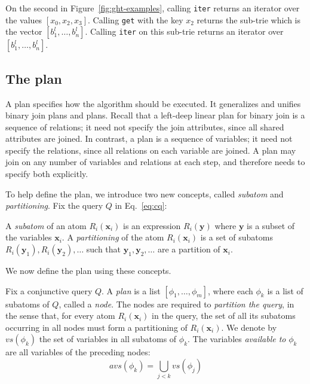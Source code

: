 \begin{example}
  On the second \GHT in Figure~\ref{fig:ght-examples},
    calling \texttt{iter} returns an 
    iterator over the values $[x_0, x_2, x_3]$.
    Calling \texttt{get} with the key $x_2$ 
    returns the sub-trie which is the vector $[b_1^l, \ldots, b_n^l]$.
  Calling \texttt{iter} on this sub-trie
    returns an iterator over $[b_1^l, \ldots, b_n^l]$.
\end{example}


\subsection{The \FJ plan}\label{sec:fj-plan}


A \FJ plan specifies how the \FJ algorithm should be executed.
It generalizes and unifies binary join plans and \GJ plans. 
Recall that a left-deep linear plan for binary join
  is a sequence of relations;
  it need not specify the join attributes, 
  since all shared attributes are joined.
In contrast, a \GJ plan is a sequence of variables;
  it need not specify the relations, 
  since all relations on each variable are joined.
A \FJ plan may join on any number of variables and relations at each step,
  and therefore needs to specify both explicitly.

  To help define the \FJ plan, we introduce two new concepts, called
  \emph{subatom} and \emph{partitioning}.  Fix the query $Q$ in
  Eq.~\eqref{eq:cq}:

\begin{definition}
  A \emph{subatom} of an atom $R_i(\bm x_i)$ is an expression
  $R_i(\bm y)$ where $\bm y$ is a subset of the variables $\bm x_i$.
  A \emph{partitioning} of the atom $R_i(\bm x_i)$ is a set of
  subatoms $R_i(\bm y_1), R_i(\bm y_2), \ldots$ such that
  $\bm y_1, \bm y_2, \ldots$ are a partition of $\bm x_i$.
\end{definition}

We now define the \FJ plan using these concepts.

\begin{definition}[\FJ Plan]
  Fix a conjunctive query $Q$.  A \FJ \emph{plan} is a list
  $[\phi_1, \ldots, \phi_m]$, where each $\phi_k$ is a list of
  subatoms of $Q$, called a {\em node}.  The nodes are required to
  {\em partition the query}, in the sense that, for every atom
  $R_i(\bm x_i)$ in the query, the set of all its subatoms occurring
  in all nodes must form a partitioning of $R_i(\bm x_i)$.  We denote
  by $vs(\phi_k)$ the set of variables in all subatoms of $\phi_k$.
  The variables \emph{available to} $\phi_k$ are all variables of the
  preceding nodes:
%
$$avs(\phi_k) = \bigcup_{j < k} vs(\phi_j)$$
%
\end{definition}

